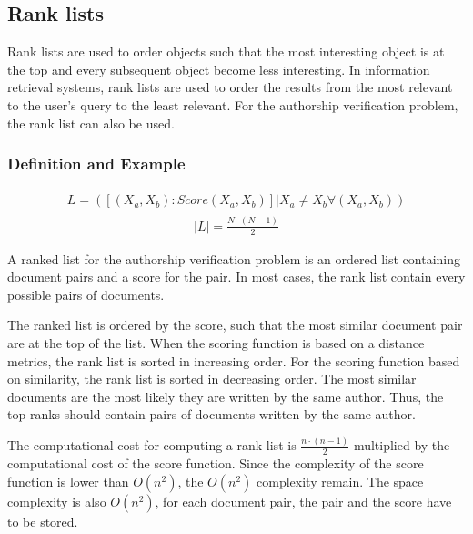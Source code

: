 \subsection{Rank lists}

Rank lists are used to order objects such that the most interesting object is at the top and every subsequent object become less interesting.
In information retrieval systems, rank lists are used to order the results from the most relevant to the user's query to the least relevant.
For the authorship verification problem, the rank list can also be used.

\subsubsection{Definition and Example}

\begin{definition}
  \begin{gather*}
      \begin{split}
        L = (\left[(X_a, X_b) : Score(X_a, X_b)\right] | X_a \neq X_b \forall (X_a, X_b))
      \end{split}
  \end{gather*}
  \begin{gather*}
    |L| = \frac{N \cdot (N - 1)}{2}
  \end{gather*}
\end{definition}

A ranked list for the authorship verification problem is an ordered list containing document pairs and a score for the pair.
In most cases, the rank list contain every possible pairs of documents.

The ranked list is ordered by the score, such that the most similar document pair are at the top of the list.
When the scoring function is based on a distance metrics, the rank list is sorted in increasing order.
For the scoring function based on similarity, the rank list is sorted in decreasing order.
The most similar documents are the most likely they are written by the same author.
Thus, the top ranks should contain pairs of documents written by the same author.

The computational cost for computing a rank list is $\frac{n \cdot (n - 1)}{2}$ multiplied by the computational cost of the score function.
Since the complexity of the score function is lower than $O(n^2)$, the $O(n^2)$ complexity remain.
The space complexity is also $O(n^2)$, for each document pair, the pair and the score have to be stored.

